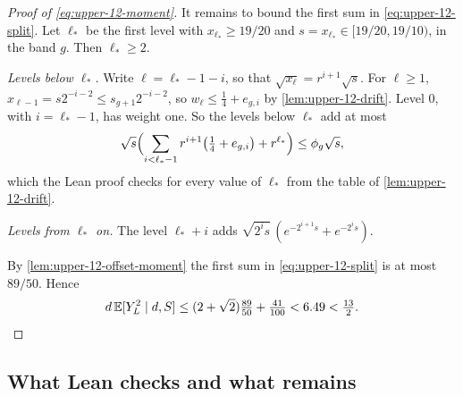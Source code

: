 \begin{proof}[Proof of \eqref{eq:upper-12-moment}]
It remains to bound the first sum in \eqref{eq:upper-12-split}. Let
$\ell_*$ be the first level with $x_{\ell_*}\ge19/20$ and
$s=x_{\ell_*}\in[19/20,19/10)$, in the band $g$. Then $\ell_*\ge2$.

\emph{Levels below $\ell_*$.} Write $\ell=\ell_*-1-i$, so that
$\sqrt{x_\ell}=r^{i+1}\sqrt s$. For $\ell\ge1$,
$x_{\ell-1}=s2^{-i-2}\le s_{g+1}2^{-i-2}$, so
$w_\ell\le\tfrac14+e_{g,i}$ by \cref{lem:upper-12-drift}. Level $0$,
with $i=\ell_*-1$, has weight one. So the levels below $\ell_*$ add at
most
\[
 \sqrt s\Bigl(\sum_{i<\ell_*-1}r^{i+1}\bigl(\tfrac14+e_{g,i}\bigr)+r^{\ell_*}\Bigr)
 \le\phi_g\sqrt s,
\]
which the Lean proof checks for every value of $\ell_*$ from the table of
\cref{lem:upper-12-drift}.

\emph{Levels from $\ell_*$ on.} The level $\ell_*+i$ adds
$\sqrt{2^is}\,(e^{-2^{i+1}s}+e^{-2^is})$.

By \cref{lem:upper-12-offset-moment} the first sum in
\eqref{eq:upper-12-split} is at most $89/50$. Hence
\[
 d\,\mathbb E[Y_L^2\mid d,S]\le(2+\sqrt2)\tfrac{89}{50}+\tfrac{41}{100}
 <6.49<\tfrac{13}{2}.\qedhere
\]
\end{proof}

\subsection{What Lean checks and what remains}\label{sec:upper-12-scope}


